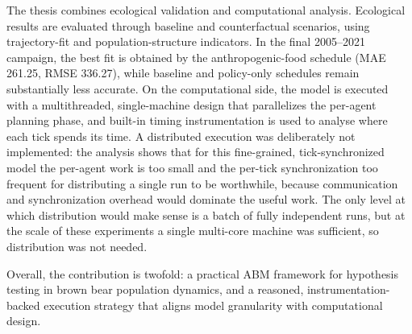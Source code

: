 \documentclass[12pt]{report}
\begin{document}
The thesis combines ecological validation and computational analysis. Ecological results are evaluated through baseline and counterfactual scenarios, using trajectory-fit and population-structure indicators. In the final 2005--2021 campaign, the best fit is obtained by the anthropogenic-food schedule (MAE 261.25, RMSE 336.27), while baseline and policy-only schedules remain substantially less accurate. On the computational side, the model is executed with a multithreaded, single-machine design that parallelizes the per-agent planning phase, and built-in timing instrumentation is used to analyse where each tick spends its time. A distributed execution was deliberately not implemented: the analysis shows that for this fine-grained, tick-synchronized model the per-agent work is too small and the per-tick synchronization too frequent for distributing a single run to be worthwhile, because communication and synchronization overhead would dominate the useful work. The only level at which distribution would make sense is a batch of fully independent runs, but at the scale of these experiments a single multi-core machine was sufficient, so distribution was not needed.

Overall, the contribution is twofold: a practical ABM framework for hypothesis testing in brown bear population dynamics, and a reasoned, instrumentation-backed execution strategy that aligns model granularity with computational design.



\tableofcontents


\newpage
{}









\end{document}

